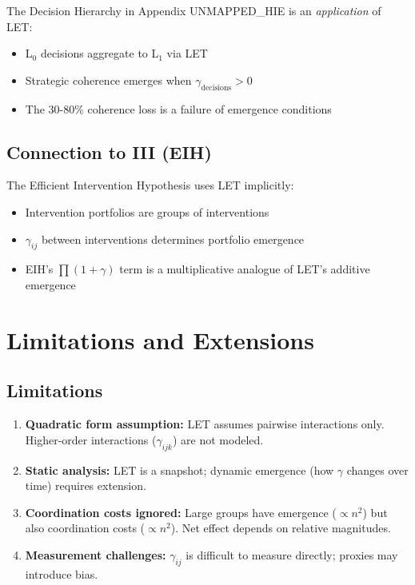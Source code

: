 The Decision Hierarchy in Appendix UNMAPPED_HIE is an \textit{application} of LET:

\begin{itemize}
\item L$_0$ decisions aggregate to L$_1$ via LET
\item Strategic coherence emerges when $\gamma_{\text{decisions}} > 0$
\item The 30-80\% coherence loss is a failure of emergence conditions
\end{itemize}

\subsection{Connection to III (EIH)}

The Efficient Intervention Hypothesis uses LET implicitly:

\begin{itemize}
\item Intervention portfolios are groups of interventions
\item $\gamma_{ij}$ between interventions determines portfolio emergence
\item EIH's $\prod(1+\gamma)$ term is a multiplicative analogue of LET's
additive emergence
\end{itemize}


\section{Limitations and Extensions}
\label{sec:let-limitations}

\subsection{Limitations}

\begin{enumerate}
\item \textbf{Quadratic form assumption:} LET assumes pairwise interactions
only. Higher-order interactions ($\gamma_{ijk}$) are not modeled.

\item \textbf{Static analysis:} LET is a snapshot; dynamic emergence
(how $\gamma$ changes over time) requires extension.

\item \textbf{Coordination costs ignored:} Large groups have emergence
($\propto n^2$) but also coordination costs ($\propto n^2$). Net effect
depends on relative magnitudes.

\item \textbf{Measurement challenges:} $\gamma_{ij}$ is difficult to
measure directly; proxies may introduce bias.
\end{enumerate}

